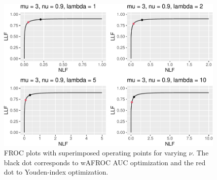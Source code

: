 \documentclass[
]{book}
\begin{document}
\begin{table}[H]

\caption{\label{tab:optim-op-point-high-performance-vary-lambda-table-vary-all}Summary of optimizations for combinations of levels of $\mu$, $\lambda$ and $\nu$ parameters. FOM = figure of merit, $\zeta_1$ = threshold that optimizes FOM, wAFROC = wAFROC-AUC, ROC = ROC-AUC, Sp = specificity and Se = sensitivity.}
\centering
{}
\end{table}

\begin{figure}
\centering
\includegraphics{21-optim-op-point_files/figure-latex/optim-op-point-high-performance-vary-lambda-vary-all-froc-1.pdf}
\caption{\label{fig:optim-op-point-high-performance-vary-lambda-vary-all-froc}FROC plots with superimposed operating points for varying \(\nu\). The black dot corresponds to wAFROC AUC optimization and the red dot to Youden-index optimization.}
\end{figure}
\end{document}
